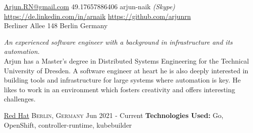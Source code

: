 \documentclass[10pt,a4paper]{article}
\begin{document}
\sloppy  %


\nobreakvspace{0.3em}  %

\noindent\href{mailto:Arjun.RN@gmail.com}{Arjun.RN\mbox{}@\mbox{}gmail.com}\sbull
\textsmaller{+}49.17657886406
\sbull arjun-naik \emph{(Skype)}
\\
\sbull
\href{https://de.linkedin.com/in/arnaik}{https://de.linkedin.com/in/arnaik}
\sbull
\href{https://github.com/arjunrn}{https://github.com/arjunrn}
\\
Berliner Allee 148\sbull
Berlin\sbull
Germany

\spacedhrule{0.9em}{-0.4em}  %


\vspace{-1.3em}  %
\begin{multicols}{2}  %
	\noindent \emph{An experienced software engineer with a background in
	infrastructure and its automation.}
	\\
	Arjun has a Master's degree in Distributed Systems Engineering for the
	Technical University of Dresden. A software engineer at heart he is also
	deeply interested in building tools and infrastructure for large systems
	where automation is key.  He likes to work in an environment which fosters
	creativity and offers interesting challenges.

\end{multicols}

\spacedhrule{0em}{-0.4em}


\headedsection
{\href{https://redhat.com/}{Red Hat}}
{\textsc{Berlin, Germany}}
{
	\headedsubsection
	{}
	{Jun 2021 - Current}
	{
		\textbf{Technologies Used:} Go, OpenShift, controller-runtime, kubebuilder
	}
}
\end{document}
